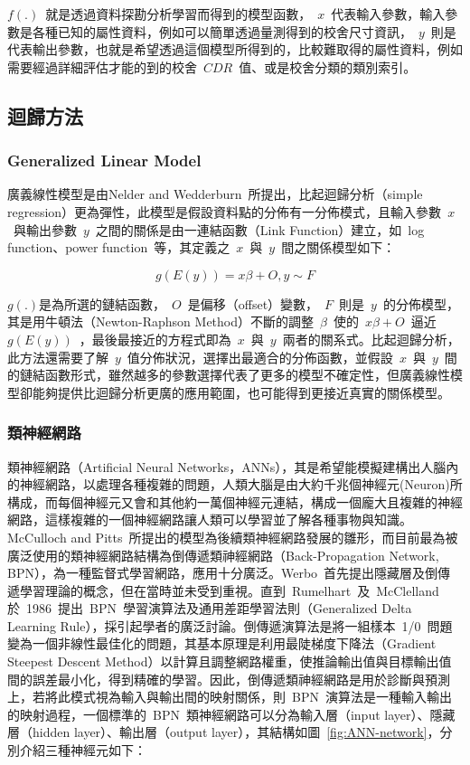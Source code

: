 $f(.)$~就是透過資料探勘分析學習而得到的模型函數，~$x$~代表輸入參數，輸入參數是各種已知的屬性資料，例如可以簡單透過量測得到的校舍尺寸資訊，~$y$~則是代表輸出參數，也就是希望透過這個模型所得到的，比較難取得的屬性資料，例如需要經過詳細評估才能的到的校舍~$CDR$~值、或是校舍分類的類別索引。

\subsection{迴歸方法}

\subsubsection{Generalized Linear Model}

廣義線性模型是由Nelder and Wedderburn~\cite{citeulike:5485398}所提出，比起迴歸分析（simple regression）更為彈性，此模型是假設資料點的分佈有一分佈模式，且輸入參數~$x$~與輸出參數~$y$~之間的關係是由一連結函數（Link Function）建立，如~log function、power function~等，其定義之~$x$~與~$y$~間之關係模型如下：


\begin{equation} g(E(y)) = x\beta + O, y \sim F \label{eq:GLM}\end{equation} 

$g(.)$是為所選的鏈結函數，~$O$~是偏移（offset）變數，~$F$~則是~$y$~的分佈模型，其是用牛頓法（Newton-Raphson Method）不斷的調整~$\beta$~使的~$x\beta + O$~逼近~$g(E(y))$~，最後最接近的方程式即為~$x$~與~$y$~兩者的關系式。比起迴歸分析，此方法還需要了解~$y$~值分佈狀況，選擇出最適合的分佈函數，並假設~$x$~與~$y$~間的鏈結函數形式，雖然越多的參數選擇代表了更多的模型不確定性，但廣義線性模型卻能夠提供比迴歸分析更廣的應用範圍，也可能得到更接近真實的關係模型。


\subsubsection{類神經網路}

類神經網路（Artificial Neural Networks，ANNs），其是希望能模擬建構出人腦內的神經網路，以處理各種複雜的問題，人類大腦是由大約千兆個神經元(Neuron)所構成，而每個神經元又會和其他約一萬個神經元連結，構成一個龐大且複雜的神經網路，這樣複雜的一個神經網路讓人類可以學習並了解各種事物與知識。McCulloch and Pitts~\cite{mcculloch1943logical}所提出的模型為後續類神經網路發展的雛形，而目前最為被廣泛使用的類神經網路結構為倒傳遞類神經網路（Back-Propagation Network, BPN），為一種監督式學習網路，應用十分廣泛。Werbo~\cite{werbos1974beyond}首先提出隱藏層及倒傳遞學習理論的概念，但在當時並未受到重視。直到~Rumelhart~及~McClelland\cite{rummelhart1986learning}於~1986~提出~BPN~學習演算法及通用差距學習法則（Generalized Delta Learning Rule），採引起學者的廣泛討論。倒傳遞演算法是將一組樣本~1/0~問題變為一個非線性最佳化的問題，其基本原理是利用最陡梯度下降法（Gradient Steepest Descent Method）以計算且調整網路權重，使推論輸出值與目標輸出值間的誤差最小化，得到精確的學習。因此，倒傳遞類神經網路是用於診斷與預測上，若將此模式視為輸入與輸出間的映射關係，則~BPN~演算法是一種輸入輸出的映射過程，一個標準的~BPN~類神經網路可以分為輸入層（input layer）、隱藏層（hidden layer）、輸出層（output layer），其結構如圖~\ref{fig:ANN-network}，分別介紹三種神經元如下：

